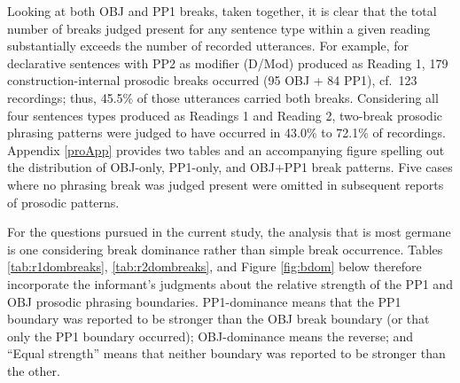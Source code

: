 \documentclass[11pt,oneside]{book}
\begin{document}
Looking at both OBJ and PP1 breaks, taken together, it is clear that the total number of breaks judged present for any sentence type within a given reading substantially exceeds the number of recorded utterances. For example, for declarative sentences with PP2 as modifier (D/Mod) produced as Reading 1, 179 construction-internal prosodic breaks occurred (95 OBJ + 84 PP1), cf.~123 recordings; thus, 45.5\% of those utterances carried both breaks. Considering all four sentences types produced as Readings 1 and Reading 2, two-break prosodic phrasing patterns were judged to have occurred in 43.0\% to 72.1\% of recordings. Appendix \ref{proApp} provides two tables and an accompanying figure spelling out the distribution of OBJ-only, PP1-only, and OBJ+PP1 break patterns. Five cases where no phrasing break was judged present were omitted in subsequent reports of prosodic patterns.

For the questions pursued in the current study, the analysis that is most germane is one considering break dominance rather than simple break occurrence. Tables \ref{tab:r1dombreaks}, \ref{tab:r2dombreaks}, and Figure \ref{fig:bdom} below therefore incorporate the informant's judgments about the relative strength of the PP1 and OBJ prosodic phrasing boundaries. PP1-dominance means that the PP1 boundary was reported to be stronger than the OBJ break boundary (or that only the PP1 boundary occurred); OBJ-dominance means the reverse; and ``Equal strength'' means that neither boundary was reported to be stronger than the other.
\end{document}
